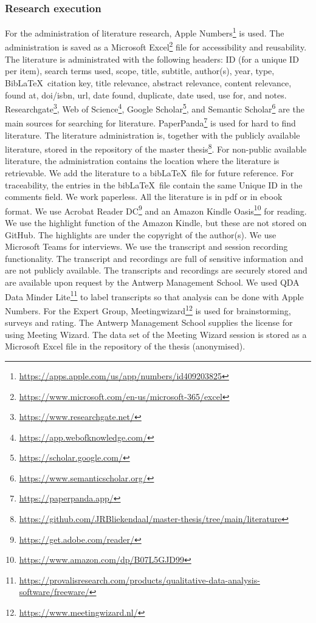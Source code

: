 \subsubsection{Research execution}
\label{subsub:tbresearchexecution}
For the administration of literature research, Apple Numbers\footnote{\url{https://apps.apple.com/us/app/numbers/id409203825}} is used. The administration is saved as a Microsoft Excel\footnote{\url{https://www.microsoft.com/en-us/microsoft-365/excel}} file for accessibility and reusability. The literature is administrated with the following headers: ID (for a unique ID per item), search terms used, scope, title, subtitle, author(s), year, type, Bib\LaTeX\ citation key, title relevance, abstract relevance, content relevance, found at, doi/isbn, url, date found, duplicate, date used, use for, and notes. Researchgate\footnote{\url{https://www.researchgate.net/}}, Web of Science\footnote{\url{https://app.webofknowledge.com/}}, Google Scholar\footnote{\url{https://scholar.google.com/}}, and Semantic Scholar\footnote{\url{https://www.semanticscholar.org/}} are the main sources for searching for literature. PaperPanda\footnote{\url{https://paperpanda.app/}} is used for hard to find literature. The literature administration is, together with the publicly available literature, stored in the repository of the master thesis\footnote{\url{https://github.com/JRBliekendaal/master-thesis/tree/main/literature}}. For non-public available literature, the administration contains the location where the literature is retrievable. We add the literature to a bib\LaTeX\ file for future reference. For traceability, the entries in the bib\LaTeX\ file contain the same Unique ID in the comments field. We work paperless. All the literature is in pdf or in ebook format. We use Acrobat Reader DC\footnote{\url{https://get.adobe.com/reader/}} and an Amazon Kindle Oasis\footnote{\url{https://www.amazon.com/dp/B07L5GJD99}} for reading. We use the highlight function of the Amazon Kindle, but these are not stored on GitHub. The highlights are under the copyright of the author(s). We use Microsoft Teams for interviews. We use the transcript and session recording functionality. The transcript and recordings are full of sensitive information and are not publicly available. The transcripts and recordings are securely stored and are available upon request by the Antwerp Management School. We used QDA Data Minder Lite\footnote{\url{https://provalisresearch.com/products/qualitative-data-analysis-software/freeware/}} to label transcripts so that analysis can be done with Apple Numbers. For the Expert Group, Meetingwizard\footnote{\url{https://www.meetingwizard.nl/}} is used for brainstorming, surveys and rating. The Antwerp Management School supplies the license for using Meeting Wizard. The data set of the Meeting Wizard session is stored as a Microsoft Excel file in the repository of the thesis (anonymised).
